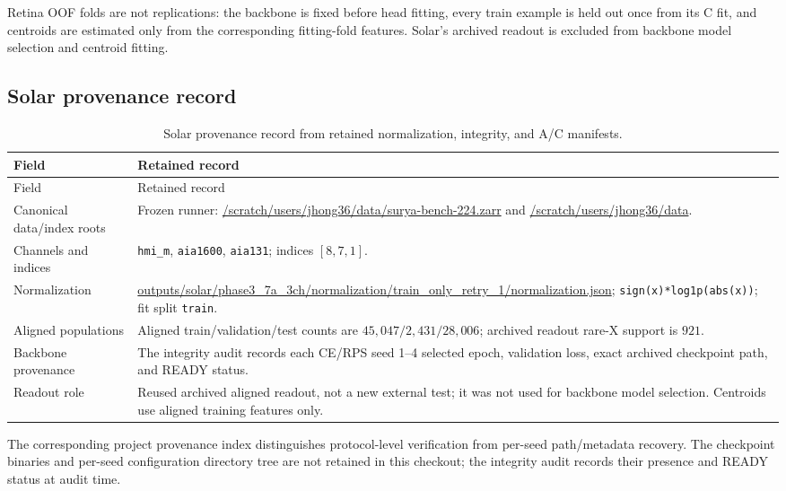 Retina OOF folds are not replications: the backbone is fixed before head
fitting, every train example is held out once from its C fit, and centroids are
estimated only from the corresponding fitting-fold features. Solar's archived
readout is excluded from backbone model selection and centroid fitting.

\subsection{Solar provenance record}

\begin{longtable}{p{.34\linewidth}p{.57\linewidth}}
\caption{Solar provenance record from retained normalization, integrity, and
A/C manifests.}\label{tab:supp-solar-provenance}\\
\toprule
Field & Retained record \\
\midrule
\endfirsthead
\toprule
Field & Retained record \\
\midrule
\endhead
Canonical data/index roots & Frozen runner: \url{/scratch/users/jhong36/data/surya-bench-224.zarr} and \url{/scratch/users/jhong36/data}. \\
Channels and indices & \texttt{hmi\_m}, \texttt{aia1600}, \texttt{aia131}; indices \([8,7,1]\). \\
Normalization & \url{outputs/solar/phase3_7a_3ch/normalization/train_only_retry_1/normalization.json}; \texttt{sign(x)*log1p(abs(x))}; fit split \texttt{train}. \\
Aligned populations & Aligned train/validation/test counts are \(45{,}047/2{,}431/28{,}006\); archived readout rare-X support is \(921\). \\
Backbone provenance & The integrity audit records each CE/RPS seed 1--4 selected epoch, validation loss, exact archived checkpoint path, and READY status. \\
Readout role & Reused archived aligned readout, not a new external test; it was not used for backbone model selection. Centroids use aligned training features only. \\
\bottomrule
\end{longtable}

The corresponding project provenance index distinguishes protocol-level
verification from per-seed path/metadata recovery. The checkpoint binaries and
per-seed configuration directory tree are not retained in this checkout; the
integrity audit records their presence and READY status at audit time.

